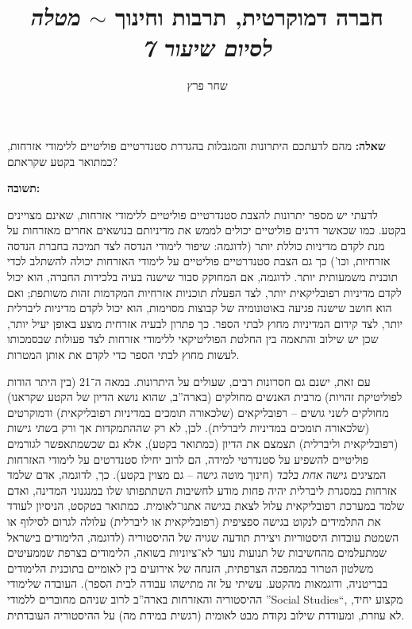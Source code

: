 \documentclass[]{../../../../tex/classes/homework}
\author{שחר פרץ}
\title{חברה  דמוקרטית, תרבות וחינוך $\sim$ \textit{מטלה לסיום שיעור 7}}
\begin{document}
	\maketitle
	
	\section{}
	\textbf{שאלה: }מהם לדעתכם היתרונות והמגבלות בהגדרת סטנדרטיים פוליטיים ללימודי אזרחות, כמתואר בקטע שקראתם?
	
	\textbf{תשובה: }
	
	לדעתי יש מספר יתרונות להצבת סטנדרטיים פוליטיים ללימודי אזרחות, שאינם מצויינים בקטע. כמו שכאשר דרגים פוליטיים יכולים לממש את מדיניותם בנושאים אחרים מאזרחות על מנת לקדם מדיניות כוללת יותר (לדוגמה: שיפור לימודי הנדסה לצד תמיכה בחברת הנדסה אזרחיות, וכו') כך גם הצבת סטנדרטיים פוליטיים על לימודי האזרחות יכולה להשתלב לכדי תוכנית משמעותית יותר. לדוגמה, אם המחוקק סבור שישנה בעיה בלכידות החברה, הוא יכול לקדם מדיניות רפובליקאית יותר, לצד הפעלת תוכניות אזרחיות המקדמות זהות משותפת; ואם הוא חושב שישנה פגיעה באוטונומיה של קבוצות מסוימות, הוא יכול לקדם מדיניות ליברלית יותר, לצד קידום המדיניות מחוץ לבתי הספר. כך פתרון לבעיה אזרחית מוצע באופן יעיל יותר, שכן יש שילוב והתאמה בין החלטת הפוליטיקאי ללימודי אזרחות לצד פעולות שבסמכותו לעשות מחוץ לבתי הספר כדי לקדם את אותן המטרות. 
	
	עם זאת, ישנם גם חסרונות רבים, שעולים על היתרונות. במאה ה־21 (בין היתר הודות לפוליטיקת זהויות) מרבית האנשים מחולקים (בארה''ב, שהוא נושא הדיון של הקטע שקראנו) מחולקים לשני גושים – רפובליקאים (שלכאורה תומכים במדיניות רפובליקאית) ודמוקרטים (שלכאורה תומכים במדיניות ליברלית). לכן, לא רק שההתמקדות אך ורק ב\textit{שתי} גישות (רפובליקאית וליברלית) תצמצם את הדיון (כמתואר בקטע), אלא גם שכשמתאפשר לגורמים פוליטיים להשפיע על סטנדרטי למידה, הם לרוב יחילו סטנדרטים על לימודי האזרחות המציגים גישה \textit{אחת בלבד} (חינוך מוטה גישה – גם מצוין בקטע). כך, לדוגמה, אדם שלמד אזרחות במסגרת ליברלית יהיה פחות מודע לחשיבות השתתפותו שלו במנגנוני המדינה, ואדם שלמד במערכת רפובליקאית עלול לצאת בגישה אתנו־לאומית. כמתואר בטקסט, הניסיון לעודד את התלמידים לנקוט בגישה ספציפית (רפובליקאית או ליברלית) עלולה לגרום לסילוף או השמטת עובדות היסטוריות ויצירת תודעה שגויה של ההיסטוריה (לדוגמה, הלימודים בישראל שמתעלמים מהחשיבות של תנועות נוער לא־ציוניות בשואה, הלימודים בצרפת שממעיטים משלטון הטרור במהפכה הצרפתית, הזנחה של אירועים בין לאומיים בתוכנית הלימודים בבריטניה, ודוגמאות מהקטע. עשיתי על זה מתישהו עבודה לבית הספר). העובדה שלימודי ההיסטוריה והאזרחות בארה''ב לרוב שניהם מחוברים ללמודי ''Social Studies``, מקצוע יחיד, לא עוזרת, ומעודדת שילוב נקודת מבט לאומית (רגשית במידת מה) על ההיסטוריה העובדתית. 
	
\end{document}
